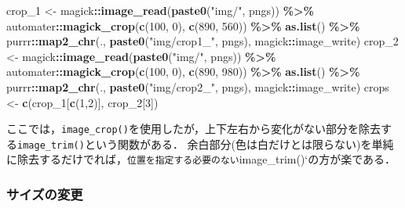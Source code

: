 \documentclass[
]{article}
\newenvironment{Shaded}{\begin{snugshade}}{\end{snugshade}}
\newcommand{\DecValTok}[1]{\textcolor[rgb]{0.00,0.00,0.81}{#1}}
\newcommand{\FunctionTok}[1]{\textcolor[rgb]{0.13,0.29,0.53}{\textbf{#1}}}
\newcommand{\NormalTok}[1]{#1}
\newcommand{\OtherTok}[1]{\textcolor[rgb]{0.56,0.35,0.01}{#1}}
\newcommand{\SpecialCharTok}[1]{\textcolor[rgb]{0.81,0.36,0.00}{\textbf{#1}}}
\newcommand{\StringTok}[1]{\textcolor[rgb]{0.31,0.60,0.02}{#1}}
\begin{document}
\begin{Shaded}
\begin{Highlighting}[]
\NormalTok{crop\_1 }\OtherTok{\textless{}{-}} 
\NormalTok{  magick}\SpecialCharTok{::}\FunctionTok{image\_read}\NormalTok{(}\FunctionTok{paste0}\NormalTok{(}\StringTok{"img/"}\NormalTok{, pngs)) }\SpecialCharTok{\%\textgreater{}\%}
\NormalTok{  automater}\SpecialCharTok{::}\FunctionTok{magick\_crop}\NormalTok{(}\FunctionTok{c}\NormalTok{(}\DecValTok{100}\NormalTok{, }\DecValTok{0}\NormalTok{), }\FunctionTok{c}\NormalTok{(}\DecValTok{890}\NormalTok{, }\DecValTok{560}\NormalTok{)) }\SpecialCharTok{\%\textgreater{}\%}
  \FunctionTok{as.list}\NormalTok{() }\SpecialCharTok{\%\textgreater{}\%}
\NormalTok{  purrr}\SpecialCharTok{::}\FunctionTok{map2\_chr}\NormalTok{(., }\FunctionTok{paste0}\NormalTok{(}\StringTok{"img/crop1\_"}\NormalTok{, pngs), magick}\SpecialCharTok{::}\NormalTok{image\_write)}
\NormalTok{crop\_2 }\OtherTok{\textless{}{-}} 
\NormalTok{  magick}\SpecialCharTok{::}\FunctionTok{image\_read}\NormalTok{(}\FunctionTok{paste0}\NormalTok{(}\StringTok{"img/"}\NormalTok{, pngs)) }\SpecialCharTok{\%\textgreater{}\%}
\NormalTok{  automater}\SpecialCharTok{::}\FunctionTok{magick\_crop}\NormalTok{(}\FunctionTok{c}\NormalTok{(}\DecValTok{100}\NormalTok{, }\DecValTok{0}\NormalTok{), }\FunctionTok{c}\NormalTok{(}\DecValTok{890}\NormalTok{, }\DecValTok{980}\NormalTok{)) }\SpecialCharTok{\%\textgreater{}\%}
  \FunctionTok{as.list}\NormalTok{() }\SpecialCharTok{\%\textgreater{}\%}
\NormalTok{  purrr}\SpecialCharTok{::}\FunctionTok{map2\_chr}\NormalTok{(., }\FunctionTok{paste0}\NormalTok{(}\StringTok{"img/crop2\_"}\NormalTok{, pngs), magick}\SpecialCharTok{::}\NormalTok{image\_write)}
\NormalTok{crops }\OtherTok{\textless{}{-}} \FunctionTok{c}\NormalTok{(crop\_1[}\FunctionTok{c}\NormalTok{(}\DecValTok{1}\NormalTok{,}\DecValTok{2}\NormalTok{)], crop\_2[}\DecValTok{3}\NormalTok{])}
\end{Highlighting}
\end{Shaded}

ここでは，\texttt{image\_crop()}を使用したが，上下左右から変化がない部分を除去する\texttt{image\_trim()}という関数がある．
余白部分(色は白だけとは限らない)を単純に除去するだけでれば，\texttt{位置を指定する必要のない}image\_trim()`の方が楽である．

\hypertarget{ux30b5ux30a4ux30baux306eux5909ux66f4}{%
\subsubsection{サイズの変更}\label{ux30b5ux30a4ux30baux306eux5909ux66f4}}
\end{document}
